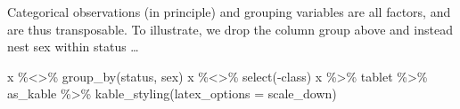 \documentclass[
]{article}
\newenvironment{Shaded}{\begin{snugshade}}{\end{snugshade}}
\newcommand{\AttributeTok}[1]{\textcolor[rgb]{0.77,0.63,0.00}{#1}}
\newcommand{\FunctionTok}[1]{\textcolor[rgb]{0.00,0.00,0.00}{#1}}
\newcommand{\NormalTok}[1]{#1}
\newcommand{\SpecialCharTok}[1]{\textcolor[rgb]{0.00,0.00,0.00}{#1}}
\newcommand{\StringTok}[1]{\textcolor[rgb]{0.31,0.60,0.02}{#1}}
\begin{document}
Categorical observations (in principle) and grouping variables are all
factors, and are thus transposable. To illustrate, we drop the column
group above and instead nest sex within status \ldots{}

\begin{Shaded}
\begin{Highlighting}[]
\NormalTok{x }\SpecialCharTok{\%\textless{}\textgreater{}\%} \FunctionTok{group\_by}\NormalTok{(status, sex)}
\NormalTok{x }\SpecialCharTok{\%\textless{}\textgreater{}\%} \FunctionTok{select}\NormalTok{(}\SpecialCharTok{{-}}\NormalTok{class)}
\NormalTok{x }\SpecialCharTok{\%\textgreater{}\%} 
\NormalTok{  tablet }\SpecialCharTok{\%\textgreater{}\%} 
\NormalTok{  as\_kable }\SpecialCharTok{\%\textgreater{}\%} 
  \FunctionTok{kable\_styling}\NormalTok{(}\AttributeTok{latex\_options =} \StringTok{\textquotesingle{}scale\_down\textquotesingle{}}\NormalTok{)}
\end{Highlighting}
\end{Shaded}
\end{document}
